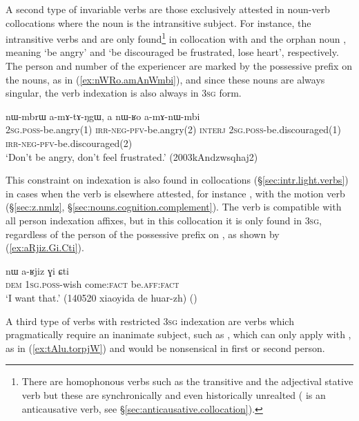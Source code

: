 A second type of invariable verbs are those exclusively attested in noun-verb collocations where the noun is the intransitive subject. For instance, the intransitive verbs  and  are only found\footnote{There are homophonous verbs such as the transitive  and the adjectival stative verb  but these are synchronically and even historically unrealted ( is an anticausative verb, see §\ref{sec:anticausative.collocation}).  } in collocation with  and the orphan noun , meaning `be angry' and `be discouraged be frustrated, lose heart', respectively. The person and number of the experiencer are marked by the possessive prefix on the nouns, as in (\ref{ex:nWRo.amAnWmbi}), and since these nouns are always singular, the verb indexation is also always in \textsc{3sg} form.

\begin{exe}
\ex   \label{ex:nWRo.amAnWmbi}
\gll  nɯ-mbrɯ a-mɤ-tɤ-ŋgɯ, a nɯ-ʁo a-mɤ-nɯ-mbi \\
\textsc{2sg}.\textsc{poss}-be.angry(1) \textsc{irr}-\textsc{neg}-\textsc{pfv}-be.angry(2) \textsc{interj} \textsc{2sg}.\textsc{poss}-be.discouraged(1) \textsc{irr}-\textsc{neg}-\textsc{pfv}-be.discouraged(2)  \\
\glt `Don't be angry, don't feel frustrated.' (2003kAndzwsqhaj2)
\end{exe}

This constraint on indexation is also found in collocations (§\ref{sec:intr.light.verbs}) in cases when the verb is elsewhere attested, for instance , with the motion verb  (§\ref{sec:z.nmlz}, §\ref{sec:nouns.cognition.complement}). The verb  is compatible with all person indexation affixes, but in this collocation it is only found in \textsc{3sg}, regardless of the person of the possessive prefix on , as shown by (\ref{ex:aRjiz.Gi.Cti}).

\begin{exe}
\ex   \label{ex:aRjiz.Gi.Cti}
\gll   nɯ a-ʁjiz ɣi ɕti \\
\textsc{dem} \textsc{1sg}.\textsc{poss}-wish come:\textsc{fact} be.\textsc{aff}:\textsc{fact} \\
\glt `I want that.' (140520 xiaoyida de huar-zh) ()
\end{exe}

A third type of verbs with restricted \textsc{3sg} indexation are verbs which pragmatically require an inanimate subject, such as , which can only apply with , as in (\ref{ex:tAlu.torpjW}) and would be nonsensical in first or second person.

